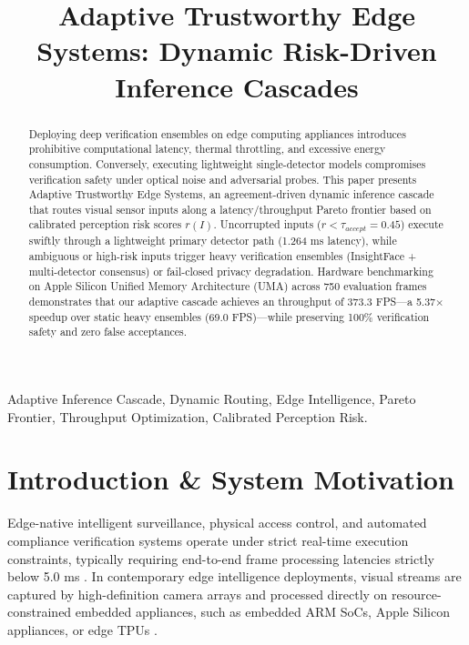 \documentclass[conference]{IEEEtran}
\begin{document}
\title{Adaptive Trustworthy Edge Systems: Dynamic Risk-Driven Inference Cascades}

\author{
}

\maketitle

\begin{abstract}
Deploying deep verification ensembles on edge computing appliances introduces prohibitive computational latency, thermal throttling, and excessive energy consumption. Conversely, executing lightweight single-detector models compromises verification safety under optical noise and adversarial probes. This paper presents Adaptive Trustworthy Edge Systems, an agreement-driven dynamic inference cascade that routes visual sensor inputs along a latency/throughput Pareto frontier based on calibrated perception risk scores $r(I)$. Uncorrupted inputs ($r < \tau_{accept} = 0.45$) execute swiftly through a lightweight primary detector path (1.264 ms latency), while ambiguous or high-risk inputs trigger heavy verification ensembles (InsightFace + multi-detector consensus) or fail-closed privacy degradation. Hardware benchmarking on Apple Silicon Unified Memory Architecture (UMA) across 750 evaluation frames demonstrates that our adaptive cascade achieves an throughput of 373.3 FPS—a 5.37$\times$ speedup over static heavy ensembles (69.0 FPS)—while preserving 100\% verification safety and zero false acceptances.
\end{abstract}

\begin{IEEEkeywords}
Adaptive Inference Cascade, Dynamic Routing, Edge Intelligence, Pareto Frontier, Throughput Optimization, Calibrated Perception Risk.
\end{IEEEkeywords}

\section{Introduction & System Motivation}
Edge-native intelligent surveillance, physical access control, and automated compliance verification systems operate under strict real-time execution constraints, typically requiring end-to-end frame processing latencies strictly below 5.0 ms \cite{b1, b2, b3}. In contemporary edge intelligence deployments, visual streams are captured by high-definition camera arrays and processed directly on resource-constrained embedded appliances, such as embedded ARM SoCs, Apple Silicon appliances, or edge TPUs \cite{b4}.
\end{document}
